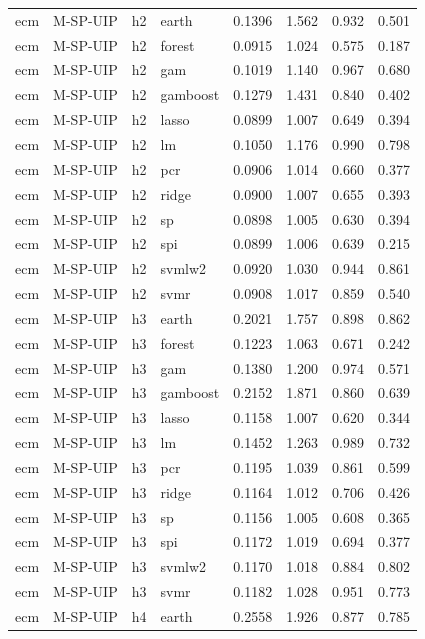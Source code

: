 \begin{ThreePartTable}
\begin{longtable}[t]{llclcccc}
\addlinespace
ecm & M-SP-UIP & h2 & earth & 0.1396 & 1.562 & 0.932 & 0.501\\
ecm & M-SP-UIP & h2 & forest & 0.0915 & 1.024 & 0.575 & 0.187\\
ecm & M-SP-UIP & h2 & gam & 0.1019 & 1.140 & 0.967 & 0.680\\
ecm & M-SP-UIP & h2 & gamboost & 0.1279 & 1.431 & 0.840 & 0.402\\
ecm & M-SP-UIP & h2 & lasso & 0.0899 & 1.007 & 0.649 & 0.394\\
ecm & M-SP-UIP & h2 & lm & 0.1050 & 1.176 & 0.990 & 0.798\\
ecm & M-SP-UIP & h2 & pcr & 0.0906 & 1.014 & 0.660 & 0.377\\
ecm & M-SP-UIP & h2 & ridge & 0.0900 & 1.007 & 0.655 & 0.393\\
ecm & M-SP-UIP & h2 & sp & 0.0898 & 1.005 & 0.630 & 0.394\\
ecm & M-SP-UIP & h2 & spi & 0.0899 & 1.006 & 0.639 & 0.215\\
ecm & M-SP-UIP & h2 & svmlw2 & 0.0920 & 1.030 & 0.944 & 0.861\\
ecm & M-SP-UIP & h2 & svmr & 0.0908 & 1.017 & 0.859 & 0.540\\
\addlinespace
ecm & M-SP-UIP & h3 & earth & 0.2021 & 1.757 & 0.898 & 0.862\\
ecm & M-SP-UIP & h3 & forest & 0.1223 & 1.063 & 0.671 & 0.242\\
ecm & M-SP-UIP & h3 & gam & 0.1380 & 1.200 & 0.974 & 0.571\\
ecm & M-SP-UIP & h3 & gamboost & 0.2152 & 1.871 & 0.860 & 0.639\\
ecm & M-SP-UIP & h3 & lasso & 0.1158 & 1.007 & 0.620 & 0.344\\
ecm & M-SP-UIP & h3 & lm & 0.1452 & 1.263 & 0.989 & 0.732\\
ecm & M-SP-UIP & h3 & pcr & 0.1195 & 1.039 & 0.861 & 0.599\\
ecm & M-SP-UIP & h3 & ridge & 0.1164 & 1.012 & 0.706 & 0.426\\
ecm & M-SP-UIP & h3 & sp & 0.1156 & 1.005 & 0.608 & 0.365\\
ecm & M-SP-UIP & h3 & spi & 0.1172 & 1.019 & 0.694 & 0.377\\
ecm & M-SP-UIP & h3 & svmlw2 & 0.1170 & 1.018 & 0.884 & 0.802\\
ecm & M-SP-UIP & h3 & svmr & 0.1182 & 1.028 & 0.951 & 0.773\\
\addlinespace
ecm & M-SP-UIP & h4 & earth & 0.2558 & 1.926 & 0.877 & 0.785\\

\end{longtable}
\end{ThreePartTable}
